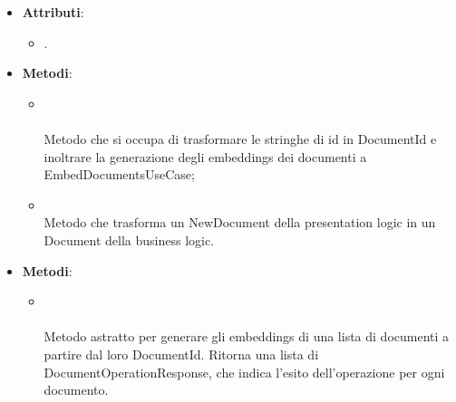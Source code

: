 \documentclass[10pt, a4paper]{article}
\begin{document}
\label{EmbedDocumentsControllerDettaglio}
\begin{itemize}
    \item \textbf{Attributi}:
    \begin{itemize}
        \item {}.
    \end{itemize}
    \item \textbf{Metodi}:
    \begin{itemize}
        \item {}\\ \\
        Metodo che si occupa di trasformare le stringhe di id in DocumentId e inoltrare la generazione degli embeddings dei documenti a EmbedDocumentsUseCase;
        \item {}\\
        Metodo che trasforma un NewDocument della presentation logic in un Document della business logic.
    \end{itemize}
\end{itemize}

\label{EmbedDocumentsUseCaseDettaglio}
\begin{itemize}
    \item \textbf{Metodi}:
    \begin{itemize}
        \item {}\\ \\
        Metodo astratto per generare gli embeddings di una lista di documenti a partire dal loro DocumentId. Ritorna una lista di DocumentOperationResponse, che indica l'esito dell'operazione per ogni documento.
    \end{itemize}
\end{itemize}
\end{document}
